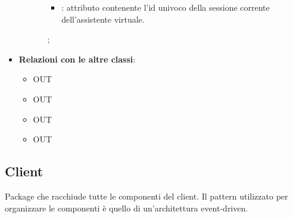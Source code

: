 \begin{itemize}
\begin{itemize}
\begin{itemize}
\begin{itemize}
				\item {}: attributo contenente l'id univoco della sessione corrente dell'assistente virtuale.
			\end{itemize}
			;
		\end{itemize}
	\end{itemize}
	\item \textbf{Relazioni con le altre classi}:
	\begin{itemize}
		\item OUT \hyperlink{LambdaContext_label}{}
		\item OUT \hyperlink{<<interface>> AgentsDAO_label}{}
		\item OUT \hyperlink{<<interface>> VAModule_label}{}
		\item OUT \hyperlink{LambdaEvent_label}{}
	\end{itemize}
\end{itemize}
\FloatBarrier

\subsection{Client}
Package che racchiude tutte le componenti del client. Il pattern utilizzato per organizzare le componenti è quello di un'architettura event-driven.
